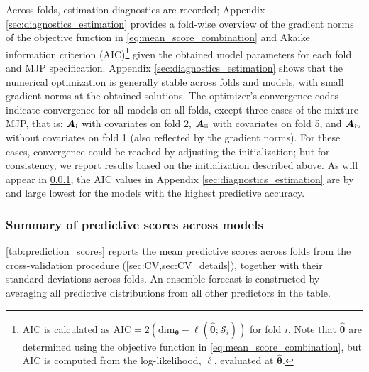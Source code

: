 \documentclass{article}
\newcommand{\RN}[1]{\textup{\uppercase\expandafter{\romannumeral#1}}}
\begin{document}
Across folds, estimation diagnostics are recorded; Appendix \ref{sec:diagnostics_estimation} provides a fold-wise overview of the gradient norms of the objective function in \cref{eq:mean_score_combination} and Akaike information criterion (AIC)\footnote{AIC is calculated as $\text{AIC} = 2 (\text{dim}_{\bm \theta} - \ell (\widehat{\bm \theta}  ; \mathcal{S}_i) )$ for fold $i$. Note that $\widehat{\bm \theta}$ are determined using the objective function in \cref{eq:mean_score_combination}, but AIC is computed from the log-likelihood, $\ell$, evaluated at $\widehat{\bm\theta}$.} given the obtained model parameters for each fold and MJP specification.
Appendix \ref{sec:diagnostics_estimation} shows that the numerical optimization is generally stable across folds and models, with small gradient norms at the obtained solutions. The optimizer’s convergence codes indicate convergence for all models on all folds, except three cases of the mixture MJP, that is: \(\bm{A}_{\RN{1}}\) with covariates on fold 2, \(\bm{A}_{\RN{2}}\) with covariates on fold 5, and \(\bm{A}_{\RN{4}}\) without covariates on fold 1 (also reflected by the gradient norms). For these cases, convergence could be reached by adjusting the initialization; but for consistency, we report results based on the initialization described above. As will appear in \cref{sec:prediction_scores_tables}, the AIC values in Appendix \ref{sec:diagnostics_estimation} are by and large lowest for the models with the highest predictive accuracy.

\subsubsection{Summary of predictive scores across models} \label{sec:prediction_scores_tables}
\cref{tab:prediction_scores} reports the mean predictive scores across folds from the cross-validation procedure (\cref{sec:CV,sec:CV_details}), together with their standard deviations across folds.
An ensemble forecast is constructed by averaging all predictive distributions from all other predictors in the table.


\end{document}
